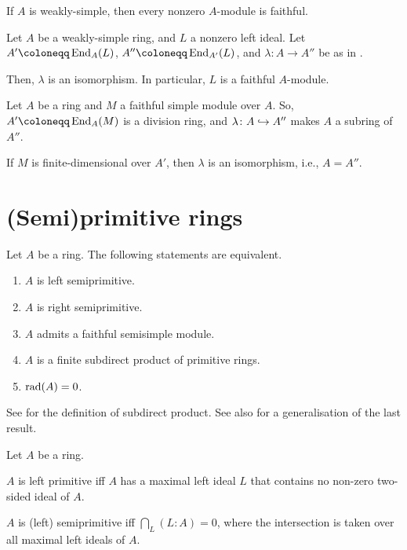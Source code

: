 \documentclass[12pt]{article}
\begin{document}
\begin{thm}
	If $A$ is weakly-simple, then every nonzero $A$-module is faithful.
\end{thm}

\begin{thm}[Rieffel]
	Let $A$ be a weakly-simple ring, and $L$ a nonzero left ideal. Let $A' \coloneqq \End_{A}(L)$, $A'' \coloneqq \End_{A'}(L)$, and $\lambda \colon A \to A''$ be as in .

	Then, $\lambda$ is an isomorphism. In particular, $L$ is a faithful $A$-module.
\end{thm}

\begin{thm}[Wedderburn]
	Let $A$ be a ring and $M$ a faithful simple module over $A$. So, $A' \coloneqq \End_{A}(M)$ is a division ring, and $\lambda \colon A \hookrightarrow A''$ makes $A$ a subring of $A''$.

	If $M$ is finite-dimensional over $A'$, then $\lambda$ is an isomorphism, i.e., $A = A''$.
\end{thm}

\section{(Semi)primitive rings}

\begin{thm} \label{thm:semi-primtive-equivalence}
	Let $A$ be a ring. The following statements are equivalent.
	\begin{enumerate}[label=(\alph*)]
		\item $A$ is left semiprimitive.
		\item $A$ is right semiprimitive.
		\item $A$ admits a faithful semisimple module.
		\item $A$ is a finite subdirect product of primitive rings.
		\item $\operatorname{rad}(A) = 0$.
	\end{enumerate}
\end{thm}
See  for the definition of subdirect product. See also  for a generalisation of the last result. 

\begin{thm}
	Let $A$ be a ring.

	$A$ is left primitive iff $A$ has a maximal left ideal $L$ that contains no non-zero two-sided ideal of $A$. 

	$A$ is (left) semiprimitive iff $\bigcap_{L}(L : A) = 0$, where the intersection is taken over all maximal left ideals of $A$.  
\end{thm}
\end{document}
